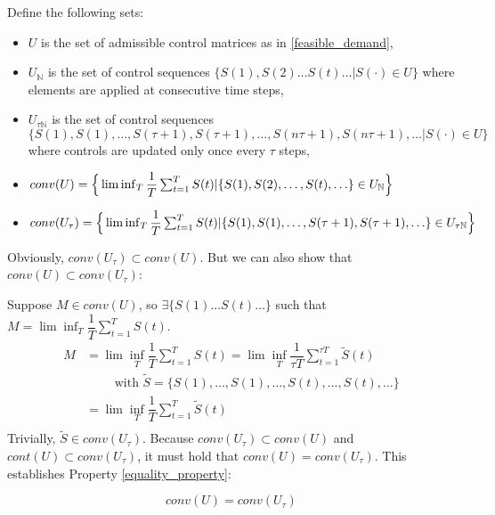 \noindent Define the following sets:
\begin{itemize}
\item $U$ is the set of admissible control matrices as in \eqref{feasible_demand},
\item $U_{\mathbb{N}}$ is the set of control sequences $\{S(1), S(2) \ldots S(t) \ldots |  S(\cdot) \in U\} $ where elements are applied at consecutive time steps,
\item $U_{\tau\mathbb{N}}$ is the set of control sequences $\{S(1), S(1), \ldots ,  S(\tau + 1),S(\tau + 1), \ldots , S(n\tau + 1),S(n\tau + 1), \ldots |  S(\cdot) \in U\} $ where controls are updated only once every $\tau$ steps,
\item $conv(U) = \Big\{\lim\inf_{T} \dfrac{1}{T}\sum_{t=1}^{T} S(t) | \{S(1), S(2), \ldots , \\ S(t), \ldots \}\in U_{\mathbb{N}} \Big\} $ 
\item $conv(U_\tau ) = \Big\{\lim\inf_{T} \dfrac{1}{T}\sum_{t=1}^{T} S(t) | \{S(1), S(1), \ldots, \\ S(\tau + 1),S(\tau + 1), \ldots\}\in U_{\tau\mathbb{N}} \Big\} $ 
\end{itemize}
Obviously, $conv(U_{\tau}) \subset conv(U)$. But we can also show that $conv(U) \subset conv(U_{\tau})$:  

\noindent Suppose $M \in conv(U)$, so $\exists \{ S(1) \ldots S(t) \ldots \}$ such that $M = \lim\inf_{T} \dfrac{1}{T}\sum_{t=1}^{T} S(t)$.
\begin{align*}
M &= \lim\inf_{T} \dfrac{1}{T}\sum_{t=1}^{T} S(t)= \lim\inf_{T} \dfrac{1}{\tau T}\sum_{t=1}^{\tau T}  \tilde{S}(t) \; \\ 
& \qquad \text{ with } \tilde{S} = \{S(1), \ldots, S(1), \ldots, S(t), \ldots, S(t), \ldots \} \\
&= \lim\inf_{T} \dfrac{1}{ T}\sum_{t=1}^{T}  \tilde{S}(t) \\
\end{align*}
Trivially, $\tilde{S }\in conv(U_\tau)$. Because $conv(U_{\tau})\subset conv(U)$ and $cont(U) \subset conv(U_{\tau})$, it must hold that $conv(U) = conv(U_{\tau})$.  This establishes Property \ref{equality_property}: 

\begin{Prop} \label{equality_property}
\begin{equation*} conv(U) = conv(U_{\tau}) \end{equation*}
\end{Prop}

